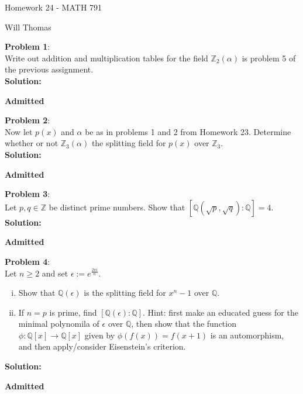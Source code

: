 \documentclass[11pt]{article}
\newcommand{\prob}[3]{\begin{flushleft}
        \textbf{Problem #1}: \\
        #2 
		\textbf{Solution:} 
		#3

\end{flushleft}}
\newcommand{\admit}{
  \begin{flushright}
    \textbf{Admitted}
  \end{flushright}
}
\newcommand{\makeHWtitle}[1]{
    \begin{center}
    \Large{Homework #1 - MATH 791} 
        \vspace{5pt}
        
        \normalsize{Will Thomas}
        \vspace{5pt}
    \end{center}
}
\begin{document}
\makeHWtitle{24}

\prob{1}{
  Write out addition and multiplication tables for the field $\mathbb{Z}_2(\alpha)$ is problem 5 of the previous assignment. \\
}{\\
  \admit
}

\prob{2}{
  Now let $p(x)$ and $\alpha$ be as in problems 1 and 2 from Homework 23.
  Determine whether or not $\mathbb{Z}_3(\alpha)$ the splitting field for $p(x)$
  over $\mathbb{Z}_3$. \\
}{\\
  \admit
}

\prob{3}{
  Let $p,q \in \mathbb{Z}$ be distinct prime numbers. Show that $[\mathbb{Q}(\sqrt{p}, \sqrt{q}) : \mathbb{Q}] = 4$. \\
}{\\
  \admit
}

\prob{4}{
  Let $n \geq 2$ and set $\epsilon := e^{\frac{2\pi i}{n}}$.
  \begin{enumerate}[(i)]
    \item Show that $\mathbb{Q}(\epsilon)$ is the splitting field for $x^n - 1$ over $\mathbb{Q}$.
    \item If $n = p$ is prime, find $[\mathbb{Q}(\epsilon) : \mathbb{Q}]$.
          Hint: first make an educated guess for the minimal polynomila of $\epsilon$
          over $\mathbb{Q}$, then show that the function $\phi : \mathbb{Q}[x] \rightarrow \mathbb{Q}[x]$ given by $\phi(f(x)) = f(x + 1)$ is an automorphism,
          and then apply/consider Eisenstein's criterion.
  \end{enumerate}
}{\\
  \admit
}
\end{document}
